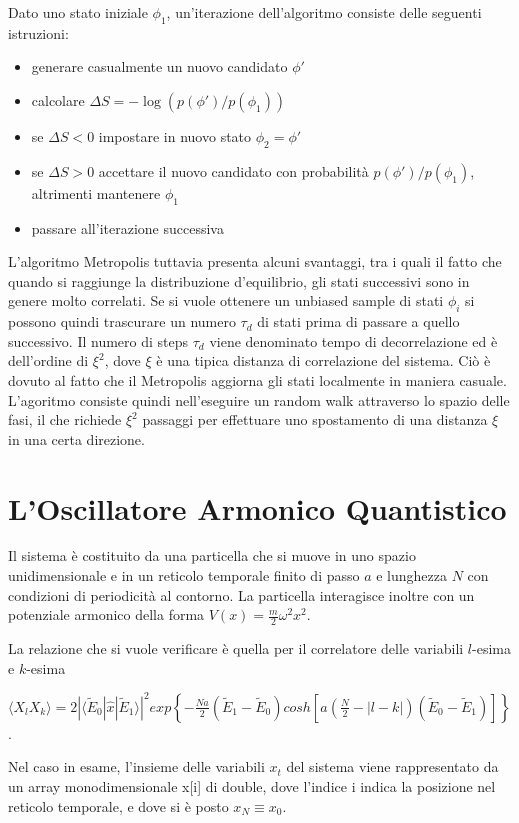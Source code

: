 Dato uno stato iniziale $\phi_1$, un'iterazione dell'algoritmo consiste delle seguenti istruzioni:
\begin{itemize}
    \item generare casualmente un nuovo candidato $\phi'$
    \item calcolare $\Delta S = -\log(p(\phi')/p(\phi_1))$
    \item se $\Delta S < 0$ impostare in nuovo stato $\phi_2=\phi'$
    \item se $\Delta S > 0$ accettare il nuovo candidato con probabilità $p(\phi')/p(\phi_1)$, altrimenti mantenere $\phi_1$
    \item passare all'iterazione successiva
\end{itemize}
L'algoritmo Metropolis tuttavia presenta alcuni svantaggi, tra i quali il fatto che quando si raggiunge la distribuzione d'equilibrio, gli stati successivi sono in genere molto correlati. Se si vuole ottenere un unbiased sample di stati $\phi_i$ si possono quindi trascurare un numero $\tau_d$ di stati prima di passare a quello successivo. Il numero di steps $\tau_d$ viene denominato tempo di decorrelazione ed è dell'ordine di $\xi^2$, dove $\xi$ è una tipica distanza di correlazione del sistema. Ciò è dovuto al fatto che il Metropolis aggiorna gli stati localmente in maniera casuale. L'agoritmo consiste quindi nell'eseguire un random walk attraverso lo spazio delle fasi, il che richiede $\xi^2$ passaggi per effettuare uno spostamento di una distanza $\xi$ in una certa direzione.

\section{L'Oscillatore Armonico Quantistico}
Il sistema è costituito da una particella che si muove in uno spazio unidimensionale e in un reticolo temporale finito di passo $a$ e lunghezza $N$ con condizioni di periodicità al contorno. La particella interagisce inoltre con un potenziale armonico della forma $V(x) = \frac{m}{2}\omega^2 x^2$.

La relazione che si vuole verificare è quella per il correlatore delle variabili $l$-esima e $k$-esima
\begin{center}
\small
$\langle X_l X_k\rangle = 2|\langle\tilde{E}_0|\hat{x}|\tilde{E}_1\rangle|^2 exp\left\{-\frac{Na}{2}(\tilde{E}_1-\tilde{E}_0)cosh\left[a\left(\frac{N}{2}-|l-k|\right)(\tilde{E}_0-\tilde{E}_1)\right]\right\}$.
\end{center}
Nel caso in esame, l'insieme delle variabili $x_t$ del sistema viene rappresentato da un array monodimensionale {\ttfamily x[i]} di {\ttfamily double}, dove l'indice {\ttfamily i} indica la posizione nel reticolo temporale, e dove si è posto $x_N \equiv x_0$.
